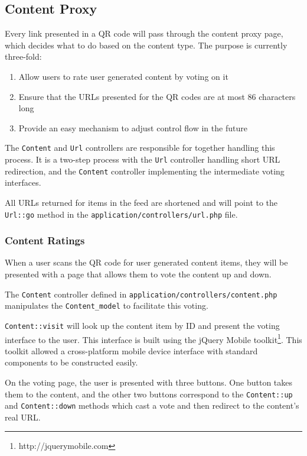 \subsection{Content Proxy}
Every link presented in a QR code will pass through the content proxy page, which decides what to do based on the content type. The purpose is currently three-fold:

\begin{enumerate}
	\item Allow users to rate user generated content by voting on it
	\item Ensure that the URLs presented for the QR codes are at most 86 characters long
	\item Provide an easy mechanism to adjust control flow in the future
\end{enumerate}

The \texttt{Content} and \texttt{Url} controllers are responsible for together handling this process. It is a two-step process with the \texttt{Url} controller handling short URL redirection, and the \texttt{Content} controller implementing the intermediate voting interfaces.

All URLs returned for items in the feed are shortened and will point to the \texttt{Url::go} method in the \texttt{application/controllers/url.php} file.

\subsubsection{Content Ratings}
When a user scans the QR code for user generated content items, they will be presented with a page that allows them to vote the content up and down.

The \texttt{Content} controller defined in \texttt{application/controllers/content.php} manipulates the \texttt{Content\_model} to facilitate this voting.

\texttt{Content::visit} will look up the content item by ID and present the voting interface to the user. This interface is built using the jQuery Mobile toolkit\footnote{http://jquerymobile.com}. This toolkit allowed a cross-platform mobile device interface with standard components to be constructed easily.

On the voting page, the user is presented with three buttons. One button takes them to the content, and the other two buttons correspond to the \texttt{Content::up} and \texttt{Content::down} methods which cast a vote and then redirect to the content's real URL.

